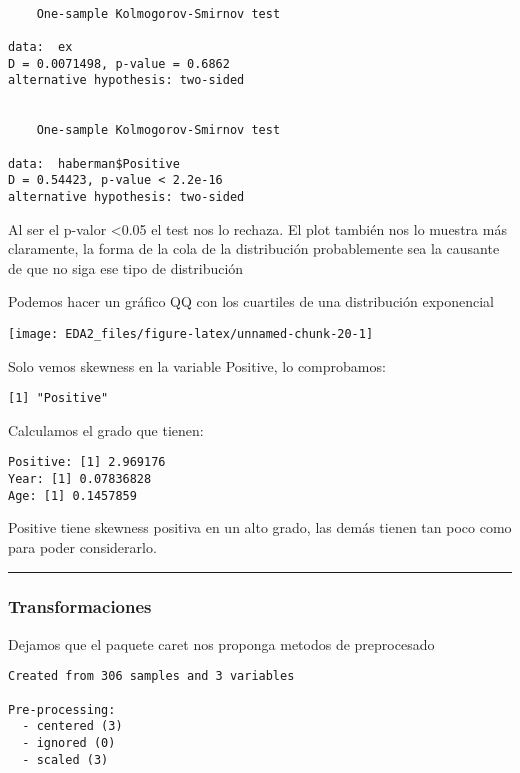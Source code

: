 \documentclass[
]{article}
\begin{document}
\begin{verbatim}

    One-sample Kolmogorov-Smirnov test

data:  ex
D = 0.0071498, p-value = 0.6862
alternative hypothesis: two-sided


    One-sample Kolmogorov-Smirnov test

data:  haberman$Positive
D = 0.54423, p-value < 2.2e-16
alternative hypothesis: two-sided
\end{verbatim}

Al ser el p-valor \textless0.05 el test nos lo rechaza. El plot también
nos lo muestra más claramente, la forma de la cola de la distribución
probablemente sea la causante de que no siga ese tipo de distribución

Podemos hacer un gráfico QQ con los cuartiles de una distribución
exponencial

\begin{center}\texttt{[image: EDA2\_files/figure-latex/unnamed-chunk-20-1]} \end{center}

Solo vemos skewness en la variable Positive, lo comprobamos:

\begin{verbatim}
[1] "Positive"
\end{verbatim}

Calculamos el grado que tienen:

\begin{verbatim}
Positive: [1] 2.969176
Year: [1] 0.07836828
Age: [1] 0.1457859
\end{verbatim}

Positive tiene skewness positiva en un alto grado, las demás tienen tan
poco como para poder considerarlo.

\begin{center}\rule{0.5\linewidth}{0.5pt}\end{center}

\hypertarget{transformaciones}{%
\subsubsection{Transformaciones}\label{transformaciones}}

Dejamos que el paquete caret nos proponga metodos de preprocesado

\begin{verbatim}
Created from 306 samples and 3 variables

Pre-processing:
  - centered (3)
  - ignored (0)
  - scaled (3)
\end{verbatim}
\end{document}
